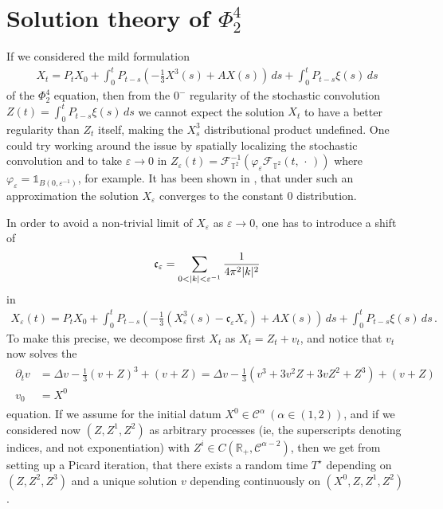 \documentclass{report}
\newcommand{\RR}{\mathbb{R}}
\newcommand{\TT}{\mathbb{T}}
\DeclarePairedDelimiter\abs{\lvert}{\rvert} %
\newcommand{\CharFunction}[1]{\mathds{1}_{#1}}
\newcommand{\Placeholder}{\,\mathrel{\cdot}\,}
\theoremstyle{remark}
\theoremstyle{definition}
\let\phi\varphi
\let\epsilon\varepsilon
\begin{document}
\chapter{Solution theory of $\Phi^4_2$}
\label{chapter:solution_theory_of_phi_4_2}
If we considered the mild formulation 
\begin{align}
  X_t = P_t X_0 + \int_{0}^{t}P_{t-s}\left(-\frac{1}{3}X^3(s) + A X(s)\right)\,ds + \int_0^t P_{t-s} \xi(s) \,ds
\end{align}
of the $\Phi^4_2$ equation, then from the $0^-$ regularity of the stochastic convolution $Z(t) = \int_0^t P_{t-s} \xi(s) \,ds$ we cannot expect the solution $X_t$ to have a better regularity than $Z_t$ itself, making the $X^3_s$ distributional product undefined. One could try working around the issue by spatially localizing the stochastic convolution and to take $\epsilon \to 0$ in $Z_\epsilon(t) = \mathcal{F}_{\TT^2}^{-1}(\phi_\epsilon \mathcal{F}_{\TT^2}(t, \Placeholder))$ where $\phi_\epsilon = \CharFunction{B(0, \epsilon^{-1})}$, for example. It has been shown in \cite{hairer2012triviality}, that under such an approximation the solution $X_\epsilon$ converges to the constant $0$ distribution.

In order to avoid a non-trivial limit of $X_\epsilon$ as $\epsilon \to 0$, one has to introduce a shift of $$\mathfrak{c}_\epsilon = \sum_{0 < \abs{k} < \epsilon^{-1}} \frac{1}{4 \pi^2 \abs{k}^2}$$ in
\begin{align}
  X_\epsilon(t) = P_t X_0 + \int_{0}^{t}P_{t-s}\left(-\frac{1}{3}\left(X^3_\epsilon(s) - \mathfrak{c}_\epsilon X_\epsilon\right)+ A X(s)\right)\,ds + \int_0^t P_{t-s} \xi(s) \,ds\,.
\end{align}
To make this precise, we decompose first $X_t$ as $X_t = Z_t + v_t$, and notice that $v_t$ now solves the 
\begin{align}
  \label{eq:phi_eq_in_v}
  \begin{split}
    \partial_t v &= \Delta v - \frac{1}{3}(v + Z)^3 + (v + Z) = \Delta v - \frac{1}{3}(v^3 + 3v^2 Z + 3v Z^2 + Z^3) + (v+Z)\\
    v_0 &= X^0
  \end{split}
\end{align}
equation. If we assume for the initial datum $X^0 \in \mathcal{C}^\alpha~(\alpha \in (1, 2))$, and if we considered now $(Z, Z^1, Z^2)$ as arbitrary processes (ie, the superscripts denoting indices, and not exponentiation) with $Z^i \in {C}(\RR_+, \mathcal{C}^{\alpha-2})$, then we get from setting up a Picard iteration, that there exists a random time $T^\star$ depending on $(Z, Z^2, Z^3)$ and a unique solution $v$ depending continuously on $(X^0, Z, Z^1, Z^2)$ \cite[Theorem 4.10.]{perkowski2024stochaIV}.
\end{document}
